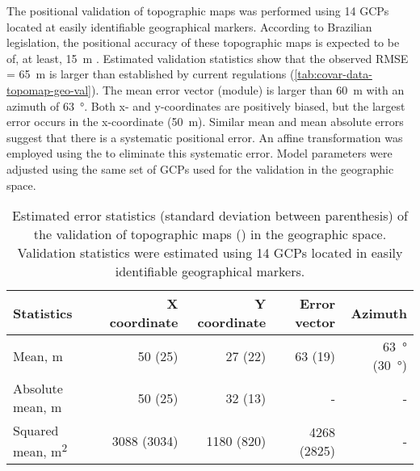 The positional validation of topographic maps was performed using \num{14} GCPs located at easily 
identifiable geographical markers. According to Brazilian legislation, the positional accuracy of 
these topographic maps is expected to be of, at least, \SI{15}{\metre} \cite{Brasil1984}. Estimated 
validation statistics show that the observed \SI{RMSE = 65}{\metre} is larger than 
established by current regulations (\autoref{tab:covar-data-topomap-geo-val}). The mean error 
vector (module) is larger than \SI{60}{\metre} with an azimuth of \SI{63}{\degree}. Both x- and 
y-coordinates are positively biased, but the largest error occurs in the x-coordinate 
(\SI{50}{\metre}). Similar mean and mean absolute errors suggest that there is a systematic 
positional error. An affine transformation was employed using the  
\cite{Carrillo2012} to eliminate this systematic error. Model parameters were adjusted using the 
same set of GCPs used for the validation in the geographic space.

\begin{table}[ht]
 \caption{Estimated error statistics (standard deviation between parenthesis) of the validation of 
 topographic maps () in the geographic space. Validation statistics were 
 estimated using \num{14} GCPs located in easily identifiable geographical markers.}
 \label{tab:tab:covar-data-topomap-geo-val}
 \centering
 {\small
 \begin{tabular}{lrrrr}
  \hline
  Statistics & X coordinate & Y coordinate & Error vector & Azimuth \\
  \hline
  Mean, \si{\metre} & 50 (25) & 27 (22) & 63 (19) & \SI{63}{\degree} (\SI{30}{\degree}) \\ 
  Absolute mean, \si{\metre} & 50 (25) & 32 (13) & - & - \\ 
  Squared mean, \si{\metre\squared} & 3088 (3034) & 1180 (820) & 4268 (2825) & - \\ 
  \hline
 \end{tabular}}
\end{table}


